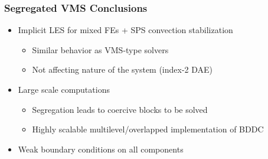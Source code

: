 \begin{frame}
\frametitle{Segregated VMS Conclusions}
\vfill
\begin{itemize}
\item Implicit LES for mixed FEs + SPS convection stabilization
\begin{itemize}
\item Similar behavior as VMS-type solvers
\item Not affecting nature of the system (index-2 DAE)
\end{itemize}
\item Large scale computations
\begin{itemize}
\item Segregation leads to coercive blocks to be solved
\item Highly scalable multilevel/overlapped implementation of BDDC
\end{itemize}
\item Weak boundary conditions on all components
\end{itemize}
\vfill
\end{frame}